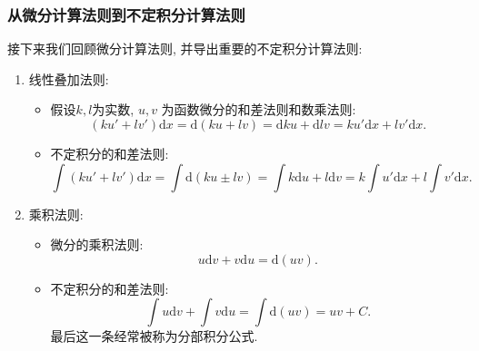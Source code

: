 \documentclass[
10pt,
aspectratio=43,
]{beamer}
\begin{document}
\begin{frame}
	\frametitle{从微分计算法则到不定积分计算法则}
	接下来我们回顾微分计算法则, 并导出重要的不定积分计算法则:\pause
	\begin{block}{}
		\begin{enumerate}
			\item 线性叠加法则:
			      \begin{itemize}
				      \item \pause 假设$k, l$为实数, $u, v$ 为函数微分的和差法则和数乘法则:
				            $$
					            (ku'+lv')\mathrm{d}x=\mathrm{d}(ku+ lv) = \mathrm{d}ku + \mathrm{d}lv=ku'\mathrm{d}x+lv'\mathrm{d}x.
				            $$
				      \item \pause 不定积分的和差法则:
				            $$
					            \int(ku'+lv')\mathrm{d}x=\int\mathrm{d}(ku\pm lv) = \int k\mathrm{d}u + l\mathrm{d}v=k\int u'\mathrm{d}x+l\int v'\mathrm{d}x.
				            $$
			      \end{itemize}
			      \pause
			\item 乘积法则:
			      \begin{itemize}
				      \item \pause 微分的乘积法则:
				            $$
					            u\mathrm{d}v+v\mathrm{d}u =\mathrm{d}(uv).
				            $$
				      \item \pause 不定积分的和差法则:
				            $$
					            \int u\mathrm{d}v+\int v\mathrm{d}u=\int\mathrm{d}(uv) = uv + C.
				            $$
				            \pause 最后这一条经常被称为分部积分公式.
			      \end{itemize}
		\end{enumerate}
	\end{block}
\end{frame}
\end{document}
